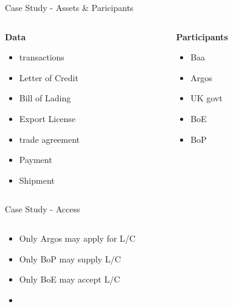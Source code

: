 \documentclass[pdf,table]{beamer}
\begin{document}
\begin{frame}{Case Study - Assets \& Paricipants}
	\begin{columns}[T]
		\begin{column}{0.48\textwidth}
			{\bf Data}
			\begin{itemize}
				\item transactions
				\item Letter of Credit
				\item Bill of Lading
				\item Export License
				\item trade agreement
				\item Payment
				\item Shipment
			\end{itemize}
		\end{column}
		\begin{column}{0.48\textwidth}
			{\bf Participants}
			\begin{itemize}
				\item Baa
				\item Argos
				\item UK govt
				\item BoE
				\item BoP
			\end{itemize}
		\end{column}
	\end{columns}	
\end{frame}

\begin{frame}{Case Study - Access}
	\begin{columns}[T]
		\begin{column}{0.48\textwidth}
			\begin{itemize}
				\item Only Argos may apply for L/C
				\item Only BoP may supply L/C
				\item Only BoE may accept L/C
				\item 
			\end{itemize}
		\end{column}
		\begin{column}{0.48\textwidth}
		\end{column}
	\end{columns}	
\end{frame}
\end{document}

